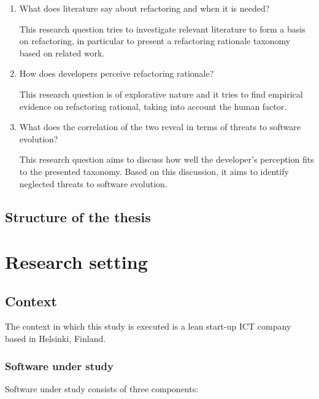 \documentclass[english,12pt,a4paper,pdftex,sci,utf8]{aaltothesis}
\begin{document}
\begin{enumerate}[label=\textbf{RQ\arabic*}]
\item What does literature say about refactoring and when it is needed?

This research question tries to investigate relevant literature to form a basis on refactoring, in particular to present a refactoring rationale taxonomy based on related work.
\item How does developers perceive refactoring rationale?

This research question is of explorative nature and it tries to find empirical evidence on refactoring rational, taking into account the human factor. 
\item What does the correlation of the two reveal in terms of threats to software evolution?

This research question aims to discuss how well the developer's perception fits to the presented taxonomy. Based on this discussion, it aims to identify neglected threats to software evolution.
\end{enumerate}

\subsection{Structure of the thesis} \label{structure}
\clearpage

\section{Research setting} \label{research setting}

\subsection{Context} \label{context}
The context in which this study is executed is a lean start-up ICT company based in Helsinki, Finland.
\subsubsection*{Software under study} \label{software}
Software under study consists of three components:
\end{document}

